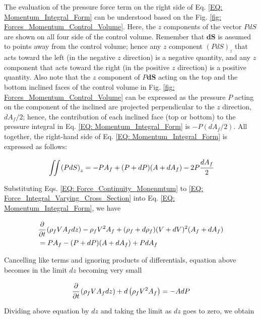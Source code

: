 \documentclass[../Article_Model_Parameters.tex]{subfiles}
\begin{document}
	The evaluation of the pressure force term on the right side of Eq. \ref{EQ: Momentum_Integral_Form} can be understood based on the Fig. \ref{fig: Forces_Momentum_Control_Volume}. Here, the $z$ components of the vector $PdS$ are shown on all four side of the control volume. Remember that $\textbf{dS}$ is assumed to points away from the control volume; hence  any $z$ component $\left( PdS \right)_z$ that acts toward the left (in the negative $z$ direction) is a negative quantity, and any $z$ component that acts toward the right (in the positive $z$ direction) is a positive quantity. Also note that the $z$ component of $P\textbf{dS}$ acting on the top and the bottom inclined faces of the control volume in Fig. \ref{fig: Forces_Momentum_Control_Volume} can be expressed as the pressure $P$ acting on the component of the inclined are projected perpendicular to the $z$ direction, $dA_f/2$; hence, the contribution of each inclined face (top or bottom) to the pressure integral in Eq. \ref{EQ: Momentum_Integral_Form} is $-P(dA_f/2)$. All together, the right-hand side of Eq. \ref{EQ: Momentum_Integral_Form} is expressed as follows:
	
	{\footnotesize
		\begin{equation}
			\iint \left( PdS \right)_z = -PA_f + (P+dP)(A+dA_f)-2P\cfrac{dA_f}{2}
			\label{EQ: Force_Integral_Varying_Cross_Section}
		\end{equation}
	}
	
	Substituting Eqs. \ref{EQ: Force_Continuity_Monenmtum} to \ref{EQ: Force_Integral_Varying_Cross_Section} into Eq. \ref{EQ: Momentum_Integral_Form}, we have
	
	{\footnotesize
		\begin{align}
			& \cfrac{\partial}{\partial t} \left( \rho_f V A_f dz \right) - \rho_f V^2 A_f + (\rho_f + d\rho_f)(V+dV)^2(A_f+dA_f)  \nonumber \\
			&= PA_f - (P+dP)(A+dA_f)+PdA_f
		\end{align}
	}
	
	Cancelling like terms and ignoring products of differentials, equation above becomes in the limit $dz$ becoming  very small
	
	{\footnotesize
		\begin{equation}
			\cfrac{\partial}{\partial t} \left( \rho_f V A_f dz \right) + d\left( \rho_f V^2 A_f \right) = -A dP
		\end{equation}
	}

	Dividing above equation by $dz$ and taking the limit as $dz$ goes to zero, we obtain
	
\end{document}
